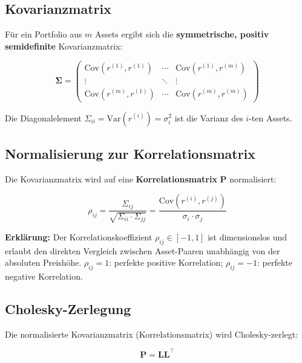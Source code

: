 \documentclass[12pt, a4paper]{article}
\begin{document}
\subsection{Kovarianzmatrix}

Für ein Portfolio aus $m$ Assets ergibt sich die \textbf{symmetrische, positiv
semidefinite} Kovarianzmatrix:

\begin{equation}
    \boldsymbol{\Sigma} = \begin{pmatrix}
        \text{Cov}(r^{(1)},r^{(1)}) & \cdots & \text{Cov}(r^{(1)},r^{(m)}) \\
        \vdots & \ddots & \vdots \\
        \text{Cov}(r^{(m)},r^{(1)}) & \cdots & \text{Cov}(r^{(m)},r^{(m)})
    \end{pmatrix}
\end{equation}

Die Diagonalelement $\Sigma_{ii} = \text{Var}(r^{(i)}) = \sigma_i^2$ ist die
Varianz des $i$-ten Assets.

\subsection{Normalisierung zur Korrelationsmatrix}

Die Kovarianzmatrix wird auf eine \textbf{Korrelationsmatrix} $\mathbf{P}$
normalisiert:

\begin{equation}
    \rho_{ij} = \frac{\Sigma_{ij}}{\sqrt{\Sigma_{ii} \cdot \Sigma_{jj}}}
    = \frac{\text{Cov}(r^{(i)},r^{(j)})}{\sigma_i \cdot \sigma_j}
\end{equation}

\textbf{Erklärung:} Der Korrelationskoeffizient $\rho_{ij} \in [-1, 1]$ ist
dimensionslos und erlaubt den direkten Vergleich zwischen Asset-Paaren unabhängig
von der absoluten Preishöhe. $\rho_{ij} = 1$: perfekte positive Korrelation;
$\rho_{ij} = -1$: perfekte negative Korrelation.

\subsection{Cholesky-Zerlegung}

Die normalisierte Kovarianzmatrix (Korrelationsmatrix) wird Cholesky-zerlegt:

\begin{equation}
    \mathbf{P} = \mathbf{L} \mathbf{L}^\top
\end{equation}
\end{document}
